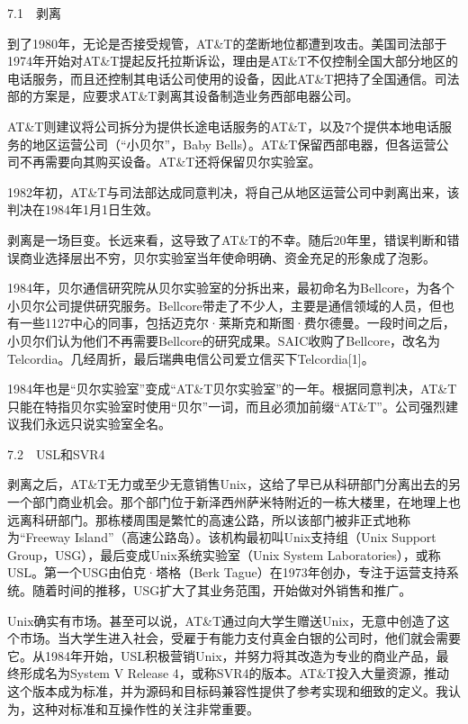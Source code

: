 \documentclass[a4paper,12pt,UTF8,twoside]{ctexbook}
\begin{document}
7.1　剥离


到了1980年，无论是否接受规管，AT\&T的垄断地位都遭到攻击。美国司法部于1974年开始对AT\&T提起反托拉斯诉讼，理由是AT\&T不仅控制全国大部分地区的电话服务，而且还控制其电话公司使用的设备，因此AT\&T把持了全国通信。司法部的方案是，应要求AT\&T剥离其设备制造业务西部电器公司。

AT\&T则建议将公司拆分为提供长途电话服务的AT\&T，以及7个提供本地电话服务的地区运营公司（“小贝尔”，Baby Bells）。AT\&T保留西部电器，但各运营公司不再需要向其购买设备。AT\&T还将保留贝尔实验室。

1982年初，AT\&T与司法部达成同意判决，将自己从地区运营公司中剥离出来，该判决在1984年1月1日生效。

剥离是一场巨变。长远来看，这导致了AT\&T的不幸。随后20年里，错误判断和错误商业选择层出不穷，贝尔实验室当年使命明确、资金充足的形象成了泡影。

1984年，贝尔通信研究院从贝尔实验室的分拆出来，最初命名为Bellcore，为各个小贝尔公司提供研究服务。Bellcore带走了不少人，主要是通信领域的人员，但也有一些1127中心的同事，包括迈克尔·莱斯克和斯图·费尔德曼。一段时间之后，小贝尔们认为他们不再需要Bellcore的研究成果。SAIC收购了Bellcore，改名为Telcordia。几经周折，最后瑞典电信公司爱立信买下Telcordia[1]。

1984年也是“贝尔实验室”变成“AT\&T贝尔实验室”的一年。根据同意判决，AT\&T只能在特指贝尔实验室时使用“贝尔”一词，而且必须加前缀“AT\&T”。公司强烈建议我们永远只说实验室全名。





7.2　USL和SVR4


剥离之后，AT\&T无力或至少无意销售Unix，这给了早已从科研部门分离出去的另一个部门商业机会。那个部门位于新泽西州萨米特附近的一栋大楼里，在地理上也远离科研部门。那栋楼周围是繁忙的高速公路，所以该部门被非正式地称为“Freeway Island”（高速公路岛）。该机构最初叫Unix支持组（Unix Support Group，USG），最后变成Unix系统实验室（Unix System Laboratories），或称USL。第一个USG由伯克·塔格（Berk Tague）在1973年创办，专注于运营支持系统。随着时间的推移，USG扩大了其业务范围，开始做对外销售和推广。

Unix确实有市场。甚至可以说，AT\&T通过向大学生赠送Unix，无意中创造了这个市场。当大学生进入社会，受雇于有能力支付真金白银的公司时，他们就会需要它。从1984年开始，USL积极营销Unix，并努力将其改造为专业的商业产品，最终形成名为System V Release 4，或称SVR4的版本。AT\&T投入大量资源，推动这个版本成为标准，并为源码和目标码兼容性提供了参考实现和细致的定义。我认为，这种对标准和互操作性的关注非常重要。
\end{document}
